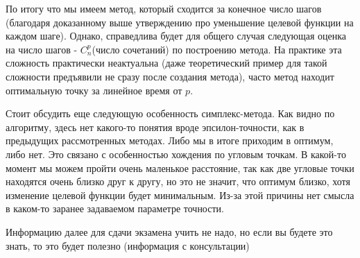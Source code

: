 По итогу что мы имеем метод, который сходится за конечное число шагов (благодаря доказанному выше утверждению про уменьшение целевой функции на каждом шаге). Однако, справедлива будет для общего случая следующая оценка на число шагов - $C_n^p$(число сочетаний) по построению метода. На практике эта сложность практически неактуальна (даже теоретический пример для такой сложности предъявили не сразу после создания метода), часто метод находит оптимальную точку за линейное время от $p$.

Стоит обсудить еще следующую особенность симплекс-метода. Как видно по алгоритму, здесь нет какого-то понятия вроде эпсилон-точности, как в предыдущих рассмотренных методах. Либо мы в итоге приходим в оптимум, либо нет. Это связано с особенностью хождения по угловым точкам. В какой-то момент мы можем пройти очень маленькое расстояние, так как две угловые точки находятся очень близко друг к другу, но это не значит, что оптимум близко, хотя изменение целевой функции будет минимальным. Из-за этой причины нет смысла в каком-то заранее задаваемом параметре точности.

Информацию далее для сдачи экзамена учить не надо, но если вы будете это знать, то это будет полезно (информация с консультации)

